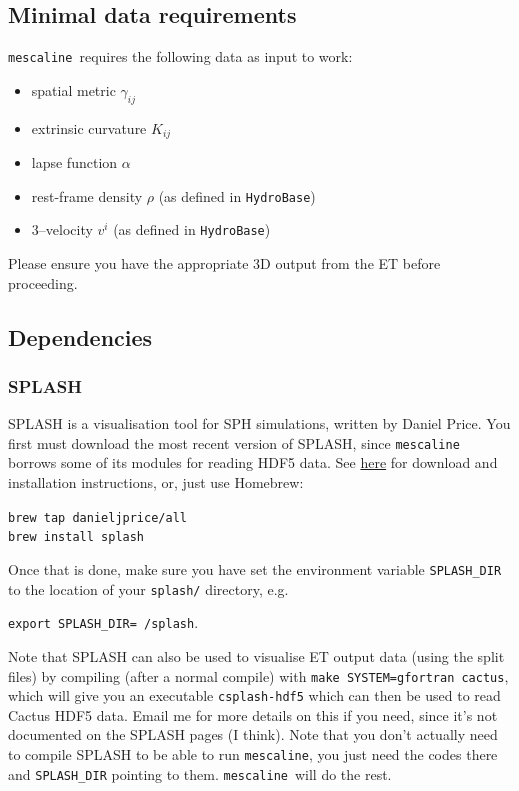 \documentclass[a4paper]{article}
\newcommand{\alp}{\alpha}
\newcommand{\gam}{\gamma}
\newcommand{\mesc}{\texttt{mescaline}}
\begin{document}
\subsection{Minimal data requirements}

\mesc\ requires the following data as input to work:
\begin{itemize}
	\item spatial metric $\gam_{ij}$
	\item extrinsic curvature $K_{ij}$
	\item lapse function $\alp$
	\item rest-frame density $\rho$ (as defined in \texttt{HydroBase})
	\item 3--velocity $v^i$ (as defined in \texttt{HydroBase})
\end{itemize}
Please ensure you have the appropriate 3D output from the ET before proceeding.


\subsection{Dependencies}

\subsubsection{SPLASH}

SPLASH is a visualisation tool for SPH simulations, written by Daniel Price. You first must download the most recent version of SPLASH, since \mesc\, borrows some of its modules for reading HDF5 data. See \href{http://users.monash.edu.au/~dprice/splash/}{here} for download and installation instructions, or, just use Homebrew:

\vspace{2mm}
\texttt{brew tap danieljprice/all} \\

\texttt{brew install splash}
\vspace{2mm}

Once that is done, make sure you have set the environment variable \texttt{SPLASH\_DIR} to the location of your \texttt{splash/} directory, e.g. 

\vspace{2mm}
\texttt{export SPLASH\_DIR=~/splash}.
\vspace{2mm}

Note that SPLASH can also be used to visualise ET output data (using the split files) by compiling (after a normal compile) with \texttt{make SYSTEM=gfortran cactus}, which will give you an executable \texttt{csplash-hdf5} which can then be used to read Cactus HDF5 data. Email me for more details on this if you need, since it's not documented on the SPLASH pages (I think). Note that you don't actually need to compile SPLASH to be able to run \mesc, you just need the codes there and \texttt{SPLASH\_DIR} pointing to them. \mesc\ will do the rest.
\end{document}
